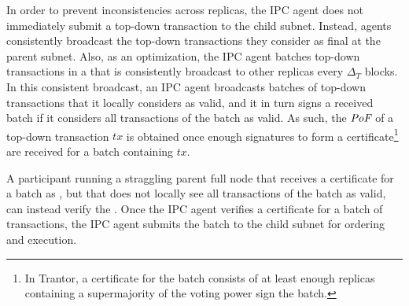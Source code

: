  In order to prevent inconsistencies across replicas, the IPC agent does not immediately submit a top-down transaction to the child subnet. Instead, \ipc agents consistently broadcast the top-down transactions they consider as final at the parent subnet. Also, as an optimization, the IPC agent batches top-down transactions in a \emph{\tcheckpoint} that is consistently broadcast to other replicas every $\Delta_T$ blocks. In this consistent broadcast, an IPC agent broadcasts batches of top-down transactions that it locally considers as valid, and it in turn signs a received batch if it considers all transactions of the batch as valid. As such, the $\textit{PoF}$ of a top-down transaction $tx$ is obtained once enough signatures to form a certificate\footnote{In Trantor, a certificate for the batch consists of at least enough replicas containing a supermajority of the voting power sign the batch.} are received for a batch containing $tx$.

A participant running a straggling parent full node that receives a certificate for a batch as \prf, but that does not locally see all transactions of the batch as valid, can instead verify the \prf. Once the IPC agent verifies a certificate for a batch of transactions, the IPC agent submits the batch to the child subnet for ordering and execution. 



